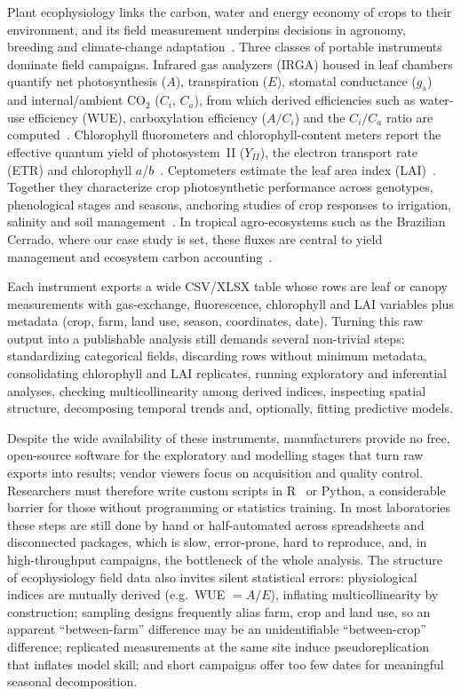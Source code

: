\documentclass[preprint,12pt,a4paper]{elsarticle}
\begin{document}
Plant ecophysiology links the carbon, water and energy economy of crops to their environment, and its field measurement underpins decisions in agronomy, breeding and climate-change adaptation~\cite{Lambers2008,Long2006}. Three classes of portable instruments dominate field campaigns. Infrared gas analyzers (IRGA) housed in leaf chambers quantify net photosynthesis ($A$), transpiration ($E$), stomatal conductance ($g_s$) and internal/ambient CO$_2$ ($C_i$, $C_a$), from which derived efficiencies such as water-use efficiency (WUE), carboxylation efficiency ($A/C_i$) and the $C_i/C_a$ ratio are computed~\cite{Farquhar1980,vonCaemmerer2000,Long2003}. Chlorophyll fluorometers and chlorophyll-content meters report the effective quantum yield of photosystem~II ($Y_{II}$), the electron transport rate (ETR) and chlorophyll $a$/$b$~\cite{Maxwell2000,Baker2008}. Ceptometers estimate the leaf area index (LAI)~\cite{Breda2003}. Together they characterize crop photosynthetic performance across genotypes, phenological stages and seasons, anchoring studies of crop responses to irrigation, salinity and soil management~\cite{Oliveira2017,Munjonji2021,Peters2012,Sanchez2003,Guarrera2024}. In tropical agro-ecosystems such as the Brazilian Cerrado, where our case study is set, these fluxes are central to yield management and ecosystem carbon accounting~\cite{Vourlitis2022}.

Each instrument exports a wide CSV/XLSX table whose rows are leaf or canopy measurements with gas-exchange, fluorescence, chlorophyll and LAI variables plus metadata (crop, farm, land use, season, coordinates, date). Turning this raw output into a publishable analysis still demands several non-trivial steps: standardizing categorical fields, discarding rows without minimum metadata, consolidating chlorophyll and LAI replicates, running exploratory and inferential analyses, checking multicollinearity among derived indices, inspecting spatial structure, decomposing temporal trends and, optionally, fitting predictive models.

Despite the wide availability of these instruments, manufacturers provide no free, open-source software for the exploratory and modelling stages that turn raw exports into results; vendor viewers focus on acquisition and quality control. Researchers must therefore write custom scripts in R~\cite{Rcore} or Python, a considerable barrier for those without programming or statistics training. In most laboratories these steps are still done by hand or half-automated across spreadsheets and disconnected packages, which is slow, error-prone, hard to reproduce, and, in high-throughput campaigns, the bottleneck of the whole analysis. The structure of ecophysiology field data also invites silent statistical errors: physiological indices are mutually derived (e.g.\ WUE $= A/E$), inflating multicollinearity by construction; sampling designs frequently alias farm, crop and land use, so an apparent ``between-farm'' difference may be an unidentifiable ``between-crop'' difference; replicated measurements at the same site induce pseudoreplication~\cite{Hurlbert1984} that inflates model skill; and short campaigns offer too few dates for meaningful seasonal decomposition.
\end{document}
